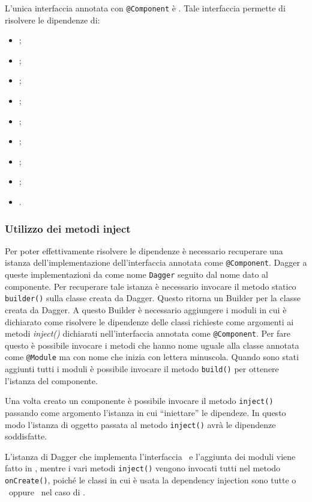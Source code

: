 \documentclass[../ManualeSviluppatore.tex]{subfiles}
\begin{document}
	L'unica interfaccia annotata con \lstinline|@Component| è \InfoComponent. Tale interfaccia permette di risolvere le dipendenze di:
	\begin{itemize}
		\item \HomeActivity;
		\item \DeveloperUnlockerActivity;
		\item \LogInformationActivity;
		\item \MainDeveloperActivity;
		\item \MainDeveloperPresenter;
		\item \MyApplication;
		\item \NavigationActivity;
		\item \NearbyPoiActivity;
		\item \PoiCategoryActivity.
	\end{itemize}

	\subsubsection{Utilizzo dei metodi inject}
	Per poter effettivamente risolvere le dipendenze è necessario recuperare una istanza dell'implementazione dell'interfaccia annotata come \lstinline|@Component|. Dagger a queste implementazioni da come nome \lstinline|Dagger| seguito dal nome dato al componente. Per recuperare tale istanza è necessario invocare il metodo statico \lstinline|builder()| sulla classe creata da Dagger. Questo ritorna un Builder per la classe creata da Dagger. A questo Builder è necessario aggiungere i moduli in cui è dichiarato come risolvere le dipendenze delle classi richieste come argomenti ai metodi \textit{inject()} dichiarati nell'interfaccia annotata come \lstinline|@Component|. Per fare questo è possibile invocare i metodi che hanno nome uguale alla classe annotata come \lstinline|@Module| ma con nome che inizia con lettera minuscola. Quando sono stati aggiunti tutti i moduli è possibile invocare il metodo \lstinline|build()| per ottenere l'istanza del componente.
	
	Una volta creato un componente è possibile invocare il metodo \lstinline|inject()| passando come argomento l'istanza in cui ``iniettare'' le dipendeze.
	In questo modo l'istanza di oggetto passata al metodo \lstinline|inject()| avrà le dipendenze soddisfatte.
	
	L'istanza di Dagger che implementa l'interfaccia \InfoComponent\ e l'aggiunta dei moduli viene fatto in \MyApplication, mentre i vari metodi \lstinline|inject()| vengono invocati tutti nel metodo \lstinline|onCreate()|, poiché le classi in cui è usata la dependency injection sono tutte o \Activity\ oppure \Application\ nel caso di \MyApplication.
		
		
\end{document}

